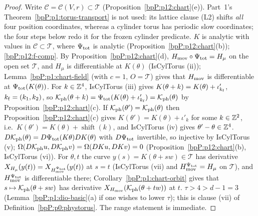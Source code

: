 \begin{proof}
Write $\mathcal C=\mathcal C(V,r)\subset\mathcal T$ (Proposition~\ref{bpP:p12:chart}(e)). Part~1's Theorem~\ref{bpP:p1:torus-transport} is not used: its lattice clause (L2) shifts \emph{all} four position coordinates, whereas a cylinder torus has periodic slow coordinates; the four steps below redo it for the frozen cylinder predicate.
\label{stepP:p12:tr-an} $K$ is analytic with values in $\mathcal C\subset\mathcal T$, where $\Psi_{\rm tot}$ is analytic (Proposition~\ref{bpP:p12:chart}(b)); \ref{bpP:p12:f-comp}. By Proposition~\ref{bpP:p12:chart}(d), $H_{\rm mov}\circ\Psi_{\rm tot}=H_\mu$ on the open set $\mathcal T$, and $H_\mu$ is differentiable at $K(\theta)$ (IsCylTorus (ii)); Lemma~\ref{bpP:p1:chart-field} (with $c=1$, $O=\mathcal T$) gives that $H_{\rm mov}$ is differentiable at $\Psi_{\rm tot}(K(\theta))$.
\label{stepP:p12:tr-per} For $k\in\mathbb{Z}^4$, IsCylTorus (iii) gives $K(\theta+k)=K(\theta)+\iota'_{k_{\rm f}}$, $k_{\rm f}=(k_1,k_2)$, so $\mathcal K_{\rm ph}(\theta+k)=\Psi_{\rm tot}(K(\theta)+\iota'_{k_{\rm f}})=\mathcal K_{\rm ph}(\theta)$ by Proposition~\ref{bpP:p12:chart}(c).
\label{stepP:p12:tr-inj} If $\mathcal K_{\rm ph}(\theta')=\mathcal K_{\rm ph}(\theta)$ then Proposition~\ref{bpP:p12:chart}(c) gives $K(\theta')=K(\theta)+\iota'_k$ for some $k\in\mathbb{Z}^2$, i.e.\ $K(\theta')=K(\theta)+\operatorname{shift}(k)$, and IsCylTorus (iv) gives $\theta'-\theta\in\mathbb{Z}^4$.
\label{stepP:p12:tr-lag} $D\mathcal K_{\rm ph}(\theta)=D\Psi_{\rm tot}(K\theta)DK(\theta)$ with $D\Psi_{\rm tot}$ invertible, so injective by IsCylTorus (v); $\Omega(D\mathcal K_{\rm ph}u,D\mathcal K_{\rm ph}v)=\Omega(DKu,DKv)=0$ (Proposition~\ref{bpP:p12:chart}(b), IsCylTorus (vi)).
\label{stepP:p12:tr-flow} For $\theta,t$ the curve $y(s)=K(\theta+sw)\in\mathcal T$ has derivative $X_{H_\mu}(y(t))=X_{H_{\rm mov}^{\Psi_{\rm tot}}}(y(t))$ at $s=t$ (IsCylTorus (vii) and $H_{\rm mov}^{\Psi_{\rm tot}}=H_\mu$ on $\mathcal T$), and $H_{\rm mov}^{\Psi_{\rm tot}}$ is differentiable there; Corollary~\ref{bpP:p1:chart-orbit} gives that $s\mapsto\mathcal K_{\rm ph}(\theta+sw)$ has derivative $X_{H_{\rm mov}}(\mathcal K_{\rm ph}(\theta+tw))$ at $t$.
\label{stepP:p12:tr-dio} $\tau>4>d-1=3$ (Lemma~\ref{bpP:p1:dio-basic}(a) if one wishes to lower $\tau$); this is clause (vii) of Definition~\ref{bpP:p0:phystorus}. The range statement is immediate.
\end{proof}

